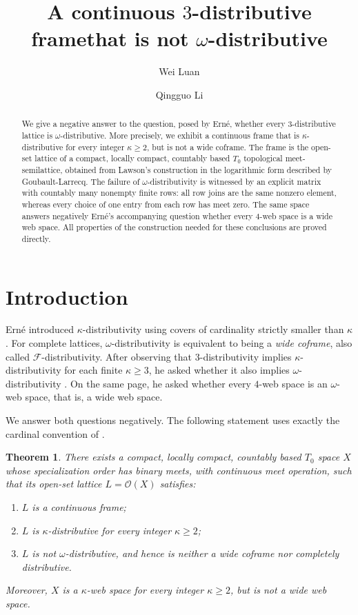 \documentclass[11pt]{amsart}
\title[Finite distributivity versus $\omega$-distributivity]
{A continuous $3$-distributive frame\break that is not $\omega$-distributive}
\date{}
\author{Wei Luan}
\author{Qingguo Li}
\newtheorem{theorem}{Theorem}[section]
\theoremstyle{definition}
\theoremstyle{remark}
\numberwithin{equation}{section}
\newcommand{\OO}{\mathcal O}
\begin{document}
\begin{abstract}
We give a negative answer to the question, posed by Ern\'e, whether
every $3$-distributive lattice is $\omega$-distributive. More precisely,
we exhibit a continuous frame that is $\kappa$-distributive for every
integer $\kappa\geq 2$, but is not a wide coframe. The frame is the
open-set lattice of a compact, locally compact, countably based
$T_0$ topological meet-semilattice, obtained from Lawson's construction
in the logarithmic form described by Goubault-Larrecq. The failure of
$\omega$-distributivity is witnessed by an explicit matrix with
countably many nonempty finite rows: all row joins are the same nonzero
element, whereas every choice of one entry from each row has meet zero.
The same space answers negatively Ern\'e's accompanying question whether
every $4$-web space is a wide web space. All properties of the
construction needed for these conclusions are proved directly.
\end{abstract}
\maketitle

\section{Introduction}

Ern\'e \cite[Section~6]{Erne2009} introduced $\kappa$-distributivity
using covers of cardinality strictly smaller than $\kappa$.
For complete lattices, $\omega$-distributivity is equivalent to being
a \emph{wide coframe}, also called $\mathcal F$-distributivity.
After observing that $3$-distributivity implies $\kappa$-distributivity
for each finite $\kappa\geq 3$, he asked whether it also implies
$\omega$-distributivity \cite[p.~2065]{Erne2009}.
On the same page, he asked whether every $4$-web space is an
$\omega$-web space, that is, a wide web space.

We answer both questions negatively. The following statement uses
exactly the cardinal convention of \cite{Erne2009}.

\begin{theorem}\label{thm:main}
There exists a compact, locally compact, countably based $T_0$ space
$X$ whose specialization order has binary meets, with continuous
meet operation, such that its open-set lattice $L=\OO(X)$ satisfies:
\begin{enumerate}
\item $L$ is a continuous frame;
\item $L$ is $\kappa$-distributive for every integer $\kappa\geq 2$;
\item $L$ is not $\omega$-distributive, and hence is neither a wide
coframe nor completely distributive.
\end{enumerate}
Moreover, $X$ is a $\kappa$-web space for every integer $\kappa\geq 2$,
but is not a wide web space.
\end{theorem}
\end{document}
